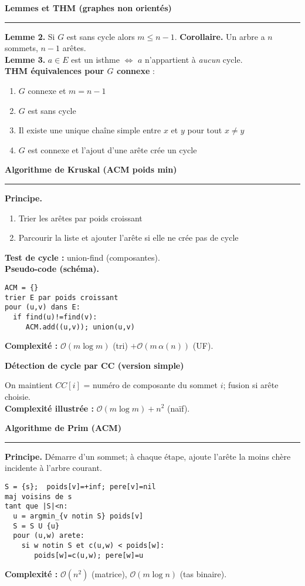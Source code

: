 \documentclass[9pt,a4paper]{article}
\newcommand{\bigO}{\mathcal{O}}
\newcommand{\sect}[1]{\vspace{1ex}\textbf{\large #1}\par\vspace{0.3ex}\hrule\vspace{0.6ex}}
\newcommand{\subsect}[1]{\vspace{0.4ex}\textbf{#1}\par}
\begin{document}
\newpage
\begin{multicols}{3}
    \sloppy\raggedcolumns
    \scriptsize

    \sect{Lemmes et THM (graphes non orientés)}
    \textbf{Lemme 2.} Si $G$ est sans cycle alors $m\le n-1$. \quad
    \textbf{Corollaire.} Un arbre a $n$ sommets, $n-1$ arêtes.\\
    \textbf{Lemme 3.} $a\in E$ est un isthme $\Leftrightarrow$ $a$ n'appartient à \emph{aucun} cycle.\\
    \textbf{THM équivalences pour $G$ connexe} :
    \begin{enumerate}
        \item $G$ connexe et $m=n-1$
        \item $G$ est sans cycle
        \item Il existe une unique chaîne simple entre $x$ et $y$ pour tout $x\neq y$
        \item $G$ est connexe et l'ajout d'une arête crée un cycle
    \end{enumerate}

    \sect{Algorithme de Kruskal (ACM poids min)}
    \textbf{Principe.}
    \begin{enumerate}
        \item Trier les arêtes par poids croissant
        \item Parcourir la liste et ajouter l'arête si elle ne crée pas de cycle
    \end{enumerate}
    \textbf{Test de cycle :} union-find (composantes).\\
    \textbf{Pseudo-code (schéma).}
    \begin{lstlisting}[style=tight]
ACM = {}
trier E par poids croissant
pour (u,v) dans E:
  if find(u)!=find(v):
     ACM.add((u,v)); union(u,v)
\end{lstlisting}
    \textbf{Complexité :} $\bigO(m\log m)$ (tri) $+\bigO(m\,\alpha(n))$ (UF).

    \subsect{Détection de cycle par CC (version simple)}
    On maintient $CC[i]$ = numéro de composante du sommet $i$; fusion si arête choisie.\\
    \textbf{Complexité illustrée :} $\bigO(m \log m)+n^2$ (naïf).

    \sect{Algorithme de Prim (ACM)}
    \textbf{Principe.} Démarre d'un sommet; à chaque étape, ajoute l'arête la moins chère incidente à l'arbre courant.
    \begin{lstlisting}[style=tight]
S = {s};  poids[v]=+inf; pere[v]=nil
maj voisins de s
tant que |S|<n:
  u = argmin_{v notin S} poids[v]
  S = S U {u}
  pour (u,w) arete:
    si w notin S et c(u,w) < poids[w]:
       poids[w]=c(u,w); pere[w]=u
\end{lstlisting}
    \textbf{Complexité :} $\bigO(n^2)$ (matrice), $\bigO(m\log n)$ (tas binaire).


\end{multicols}
\end{document}
